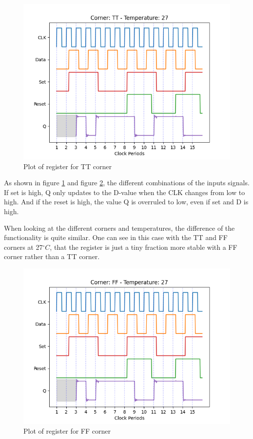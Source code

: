 \begin{figure}[H]
    \centering
    \includegraphics[width=\textwidth]{Figures/Aimspice_Plots/TT_27.png}
    \caption{Plot of register for TT corner}
    \label{fig:result_TT27}
\end{figure}

As shown in figure \ref{fig:result_TT27} and figure \ref{fig:result_FF27}, the different combinations of the inputs signals. If set is high, Q only updates to the D-value when the CLK changes from low to high. And if the reset is high, the value Q is overruled to low, even if set and D is high.

When looking at the different corners and temperatures, the difference of the functionality is quite similar. One can see in this case with the TT and FF corners at 27$^\circ C$, that the register is just a tiny fraction more stable with a FF corner rather than a TT corner.

\begin{figure}[H]
    \centering
    \includegraphics[width=\textwidth]{Figures/Aimspice_Plots/FF_27.png}
    \caption{Plot of register for FF corner}
    \label{fig:result_FF27}
\end{figure}

